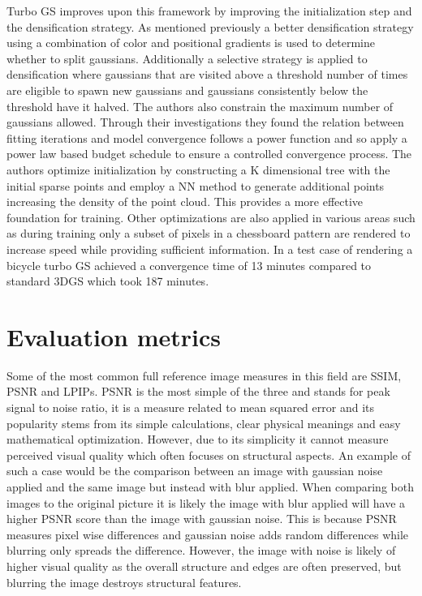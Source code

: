 \documentclass[10pt,twocolumn]{article}
\begin{document}
Turbo GS improves upon this framework by improving the initialization step and the densification strategy. As mentioned previously a better densification strategy using a combination of color and positional gradients is used to determine whether to split gaussians. Additionally a selective strategy is applied to densification where gaussians that are visited above a threshold number of times are eligible to spawn new gaussians and gaussians consistently below the threshold have it halved. The authors also constrain the maximum number of gaussians allowed. Through their investigations they found the relation between fitting iterations and model convergence follows a power function and so apply a power law based budget schedule to ensure a controlled convergence process. The authors optimize initialization by constructing a K dimensional tree with the initial sparse points and employ a NN method to generate additional points increasing the density of the point cloud. This provides a more effective foundation for training. Other optimizations are also applied in various areas such as during training only a subset of pixels in a chessboard pattern are rendered to increase speed while providing sufficient information. In a test case of rendering a bicycle turbo GS achieved a convergence time of 13 minutes compared to standard 3DGS which took 187 minutes\cite{lu2024turbogsaccelerating3dgaussian}. 


\section{Evaluation metrics}

Some of the most common full reference image measures in this field are SSIM, PSNR and LPIPs. PSNR is the most simple of the three and stands for peak signal to noise ratio, it is a measure related to mean squared error and its popularity stems from its simple calculations, clear physical meanings and easy mathematical optimization. However, due to its simplicity it cannot measure perceived visual quality which often focuses on structural aspects\cite{1284395}. An example of such a case would be the comparison between an image with gaussian noise applied and the same image but instead with blur applied. When comparing both images to the original picture it is likely the image with blur applied will have a higher PSNR score than the image with gaussian noise. This is because PSNR measures pixel wise differences and gaussian noise adds random differences while blurring only spreads the difference. However, the image with noise is likely of higher visual quality as the overall structure and edges are often preserved, but blurring the image destroys structural features.
\end{document}

